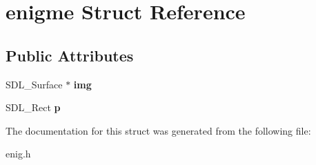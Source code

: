\hypertarget{structenigme}{}\section{enigme Struct Reference}
\label{structenigme}
\subsection*{Public Attributes}
\begin{DoxyCompactItemize}
\item 
\mbox{\label{structenigme_ac5c2141e5f8c366ff16d1fad83ee3e54}} 
S\+D\+L\+\_\+\+Surface $\ast$ {\bfseries img}
\item 
\mbox{\label{structenigme_a1ecc3fa572d2c308e1aecacf74fd1ec0}} 
S\+D\+L\+\_\+\+Rect {\bfseries p}
\end{DoxyCompactItemize}


The documentation for this struct was generated from the following file\+:\begin{DoxyCompactItemize}
\item 
enig.\+h\end{DoxyCompactItemize}
